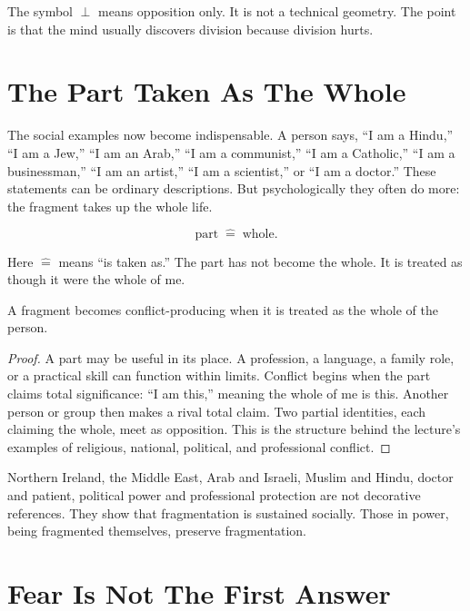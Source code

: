 \documentclass[11pt,oneside]{book}
\begin{document}
The symbol \(\perp\) means opposition only. It is not a technical geometry. The point is that the mind usually discovers division because division hurts.

\section{The Part Taken As The Whole}

The social examples now become indispensable. A person says, ``I am a Hindu,'' ``I am a Jew,'' ``I am an Arab,'' ``I am a communist,'' ``I am a Catholic,'' ``I am a businessman,'' ``I am an artist,'' ``I am a scientist,'' or ``I am a doctor.'' These statements can be ordinary descriptions. But psychologically they often do more: the fragment takes up the whole life.

\begin{equation}
\text{part}\;\widehat{=}\;\text{whole}.
\end{equation}

Here \(\widehat{=}\) means ``is taken as.'' The part has not become the whole. It is treated as though it were the whole of me.

\begin{proposition}
A fragment becomes conflict-producing when it is treated as the whole of the person.
\end{proposition}

\begin{proof}
A part may be useful in its place. A profession, a language, a family role, or a practical skill can function within limits. Conflict begins when the part claims total significance: ``I am this,'' meaning the whole of me is this. Another person or group then makes a rival total claim. Two partial identities, each claiming the whole, meet as opposition. This is the structure behind the lecture's examples of religious, national, political, and professional conflict.
\end{proof}

Northern Ireland, the Middle East, Arab and Israeli, Muslim and Hindu, doctor and patient, political power and professional protection are not decorative references. They show that fragmentation is sustained socially. Those in power, being fragmented themselves, preserve fragmentation.

\section{Fear Is Not The First Answer}
\end{document}
